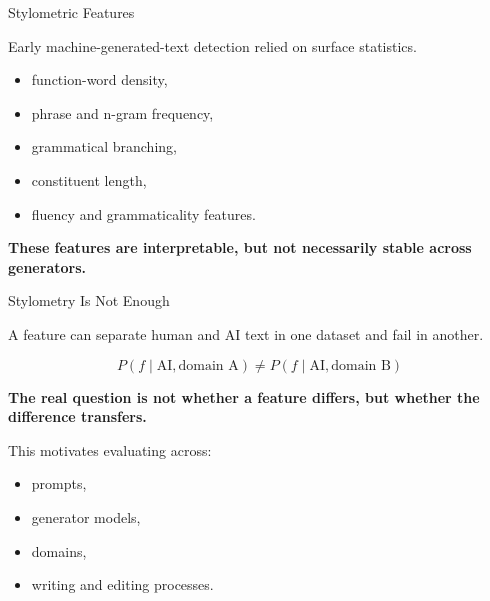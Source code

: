 \documentclass[11pt,compress,t,notes=noshow, xcolor=table]{beamer}
\begin{document}
\begin{vbframe}{Stylometric Features}

Early machine-generated-text detection relied on surface statistics.

\begin{itemize}
    \item function-word density,
    \item phrase and n-gram frequency,
    \item grammatical branching,
    \item constituent length,
    \item fluency and grammaticality features.
\end{itemize}

\begin{center}
\textbf{These features are interpretable, but not necessarily stable across generators.}
\end{center}


\end{vbframe}

\begin{vbframe}{Stylometry Is Not Enough}

A feature can separate human and AI text in one dataset and fail in another.

\[
P(f\mid \text{AI},\text{domain A})
\neq
P(f\mid \text{AI},\text{domain B})
\]

\begin{center}
\textbf{The real question is not whether a feature differs, but whether the difference transfers.}
\end{center}

This motivates evaluating across:

\begin{itemize}
    \item prompts,
    \item generator models,
    \item domains,
    \item writing and editing processes.
\end{itemize}

\end{vbframe}
\end{document}
